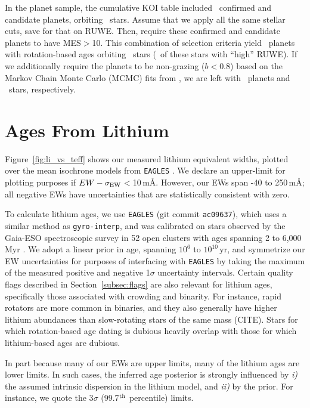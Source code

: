 \documentclass[11pt,twocolumn,tighten]{aastex63}
\begin{document}
In the planet sample, the cumulative KOI table included
\nnonfpcumkois\ confirmed and candidate planets, orbiting
\nnonfpcumkoihosts\ stars.  Assume that we apply all the same stellar
cuts, save for that on RUWE.  Then, require these confirmed and
candidate planets to have MES$>$10.  This combination of selection
criteria yield \nplwgyroagewithgrazingandhighruwe\ planets with
rotation-based ages orbiting
\nplhoststarwgyroagewithgrazingandhighruwe\ stars
(\nplhoststarwgyroagejusthighruwe\ of these stars with ``high'' RUWE).
If we additionally require the planets to be non-grazing ($b<0.8$)
based on the Markov Chain Monte Carlo (MCMC) fits from
\citet{Thompson_2018}, we are left with \nplwgyroagenograzing\ planets and
\nplhoststarwgyroagenograzing\ stars, respectively.




\section{Ages From Lithium}
\label{sec:liage}


Figure~\ref{fig:li_vs_teff} shows our measured lithium equivalent
widths, plotted over the mean isochrone models from
\texttt{EAGLES} \citep{Jeffries_2023}.  We declare an upper-limit for
plotting purposes if ${EW}-\sigma_{\rm EW}$$<$10\,m\AA.  However, our
EWs span -40 to 250\,m\AA; all negative EWs have uncertainties that
are statistically consistent with zero.

To calculate lithium ages, we use \texttt{EAGLES} (git commit
\texttt{ac09637}), which uses a similar method as
\texttt{gyro-interp}, and was calibrated on stars observed by the
Gaia-ESO spectroscopic survey in 52 open clusters with ages spanning 2
to 6{,}000\,Myr \citep{Jeffries_2023}.  We adopt a linear prior in
age, spanning $10^6$ to $10^{10}$\,yr, and symmetrize our EW
uncertainties for purposes of interfacing with \texttt{EAGLES} by
taking the maximum of the measured positive and negative 1$\sigma$
uncertainty intervals.
Certain quality flags described in Section~\ref{subsec:flags} are also
relevant for lithium ages, specifically those associated with
crowding and binarity.
For instance, rapid rotators are more common in binaries, and they also
generally have higher lithium abundances than slow-rotating stars of the
same mass (CITE).
Stars for which rotation-based age dating is dubious heavily overlap
with those for which lithium-based ages are dubious.

In part because many of our EWs are upper limits, 
many of the lithium ages are lower limits.
In such cases,  the inferred age posterior is strongly influenced by
{\it i)} the assumed intrinsic dispersion in the lithium model,
and {\it ii)} by the prior.
For instance, 
 we quote the 3$\sigma$ (99.7$^{\rm th}$ percentile) limits.
\end{document}
